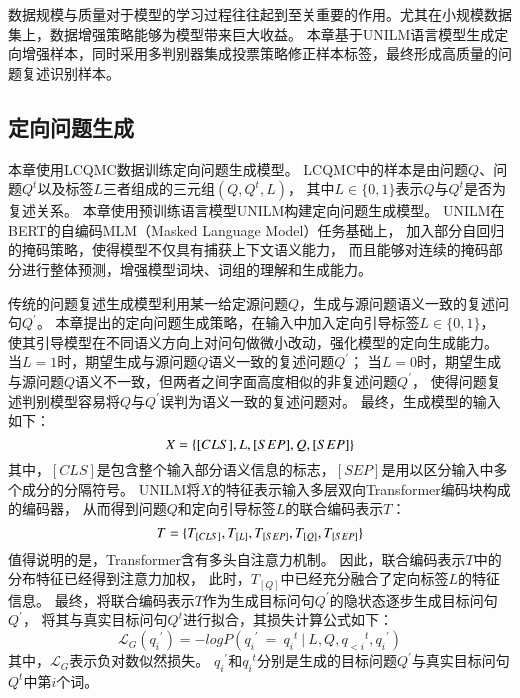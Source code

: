 数据规模与质量对于模型的学习过程往往起到至关重要的作用。尤其在小规模数据集上，数据增强策略能够为模型带来巨大收益。
本章基于UNILM语言模型生成定向增强样本，同时采用多判别器集成投票策略修正样本标签，最终形成高质量的问题复述识别样本。

\subsection{定向问题生成}

本章使用LCQMC数据训练定向问题生成模型。
LCQMC中的样本是由问题$Q$、问题$Q^t$以及标签$L$三者组成的三元组$(Q,Q^t,L)$，
其中$L\in\{0,1\}$表示$Q$与$Q^t$是否为复述关系。
本章使用预训练语言模型UNILM构建定向问题生成模型。
UNILM在BERT的自编码MLM（Masked Language Model）\cite{taylor1953cloze}任务基础上，
加入部分自回归的掩码策略，使得模型不仅具有捕获上下文语义能力，
而且能够对连续的掩码部分进行整体预测，增强模型词块、词组的理解和生成能力。

传统的问题复述生成模型利用某一给定源问题$Q$，生成与源问题语义一致的复述问句$Q^\prime$。
本章提出的定向问题生成策略，在输入中加入定向引导标签$L\in\{0,1\}$，
使其引导模型在不同语义方向上对问句做微小改动，强化模型的定向生成能力。
当$L=1$时，期望生成与源问题$Q$语义一致的复述问题$Q^\prime$；
当$L=0$时，期望生成与源问题$Q$语义不一致，但两者之间字面高度相似的非复述问题$Q^\prime$，
使得问题复述判别模型容易将$Q$与$Q^\prime$误判为语义一致的复述问题对。
最终，生成模型的输入如下：
\begin{equation}
    X=\{[CLS],L,[SEP],Q,[SEP]\} \notag
\end{equation}
其中，$[CLS]$是包含整个输入部分语义信息的标志，$[SEP]$是用以区分输入中多个成分的分隔符号。
UNILM将$X$的特征表示输入多层双向Transformer\cite{vaswani2017attention}编码块构成的编码器，
从而得到问题$Q$和定向引导标签$L$的联合编码表示$T$：
\begin{equation}
    T=\{T_{[CLS]},T_{[L]},T_{[SEP]},T_{[Q]},T_{[SEP]}\} \notag
\end{equation}
值得说明的是，Transformer含有多头自注意力机制。
因此，联合编码表示$T$中的分布特征已经得到注意力加权，
此时，$T_{[Q]}$中已经充分融合了定向标签$L$的特征信息。
最终，将联合编码表示$T$作为生成目标问句$Q^\prime$的隐状态逐步生成目标问句$Q^\prime$，
将其与真实目标问句$Q^t$进行拟合，其损失计算公式如下：
\begin{equation}
    \mathcal{L}_G({q_i}^\prime)=-logP({q_i}^\prime\ =\ {q_i}^t\ |\  L,Q,{q_{<i}}^t,{q_i}^\prime)
\end{equation}
其中，$\mathcal{L}_G$表示负对数似然损失。
${q_i}^\prime$和${q_i}^t$分别是生成的目标问题$Q^\prime$与真实目标问句$Q^t$中第$i$个词。

